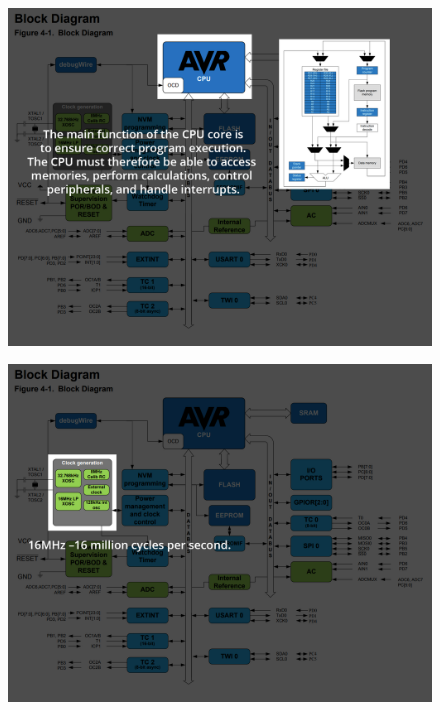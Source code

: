 \begin{frame}
	\begin{figure}
		\includegraphics[scale=.2]{assets/cpu}  
	\end{figure}
\end{frame}

\begin{frame}
	\begin{figure}
		\includegraphics[scale=.2]{assets/clock}  
	\end{figure}
\end{frame}


